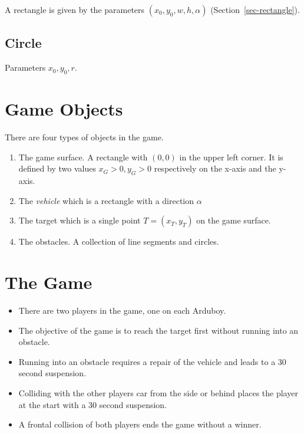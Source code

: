 \documentclass[11pt]{article}
\begin{document}
A rectangle is given by the parameters $(x_0, y_0, w, h, \alpha)$
(Section~\ref{sec-rectangle}).


\subsection*{Circle}

Parameters $x_0, y_0, r$.

\section{Game Objects}
\label{sec-game-objects}
There are four types of objects in the game.
\begin{enumerate}
    \item The game surface. A rectangle with $(0,0)$ in the upper left corner.
        It is defined by two values $x_G > 0, y_G>0$ respectively on the x-axis
        and the y-axis.
    \item The {\sl vehicle} which is a rectangle with a direction $\alpha$
    \item The target which is a single point $T = (x_T, y_T)$ on the game
        surface.
    \item The obstacles. A collection of line segments and circles.
\end{enumerate}

\section{The Game}
\label{sec-the-game}
\begin{itemize}
    \item There are two players in the game, one on each Arduboy.
    \item The objective of the game is to reach the target first without
        running into an obstacle.
    \item Running into an obstacle requires a repair of the vehicle and leads
        to a 30 second suspension.
    \item Colliding with the other players car from the side or behind places
        the player at the start with a 30 second suspension.
    \item A frontal collision of both players ends the game without a winner.
\end{itemize}
\end{document}
